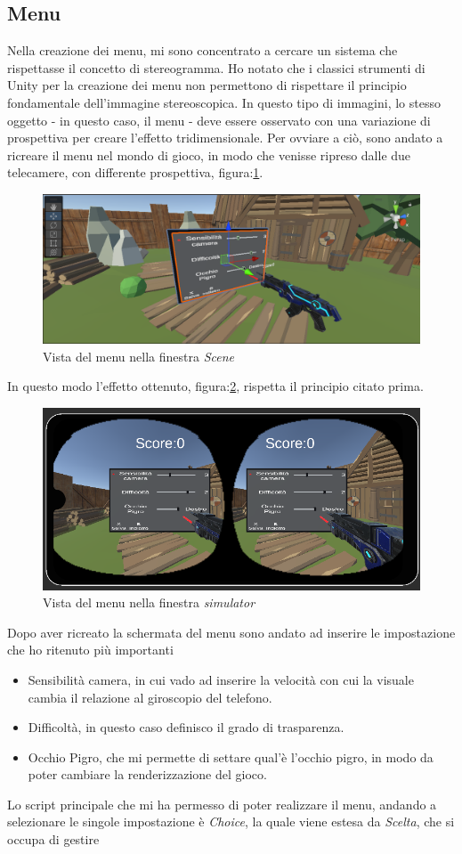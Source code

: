 \documentclass[
a4paper,
cleardoublepage=empty,
headings=twolinechapter,
numbers=autoenddot,
]{scrbook}
\begin{document}
     \subsection{Menu}
     Nella creazione dei menu, mi sono concentrato a cercare un sistema che rispettasse il concetto di stereogramma\cite{Stereogramma}. Ho notato che i classici strumenti di Unity per la creazione dei menu non permettono di rispettare il principio fondamentale dell'immagine stereoscopica. In questo tipo di immagini, lo stesso oggetto - in questo caso, il menu - deve essere osservato con una variazione di prospettiva per creare l'effetto tridimensionale.
     Per ovviare a ciò, sono andato a ricreare il menu nel mondo di gioco, in modo che venisse ripreso dalle due telecamere, con differente prospettiva, figura:\ref{fig:menu_scena}.
     \begin{figure}[H]
    	\centering
    	\includegraphics[width=0.6\linewidth]{image/menu_scena}
    	\caption{Vista del menu nella finestra \textit{Scene}}
    	\label{fig:menu_scena}
    \end{figure}
    In questo modo l'effetto ottenuto, figura:\ref{fig:menu_simulator}, rispetta il principio citato prima.
     \begin{figure}[h]
    	\centering
    	\includegraphics[width=0.6\linewidth]{image/menu_simulatore}
    	\caption{Vista del menu nella finestra \textit{simulator}}
    	\label{fig:menu_simulator}
    \end{figure}
    Dopo aver ricreato la schermata del menu sono andato ad inserire le impostazione che ho ritenuto più importanti
    \begin{itemize}
    	\item Sensibilità camera, in cui vado ad inserire la velocità con cui la visuale cambia il relazione al giroscopio del telefono.
    	\item Difficoltà, in questo caso definisco il grado di trasparenza. 
    	\item Occhio Pigro, che mi permette di settare qual'è l'occhio pigro, in modo da poter cambiare la renderizzazione del gioco.
    \end{itemize}
    Lo script principale che mi ha permesso di poter realizzare il menu, andando a selezionare le singole impostazione è \textit{Choice}, la quale viene estesa da \textit{Scelta}, che si occupa di gestire
\end{document}
